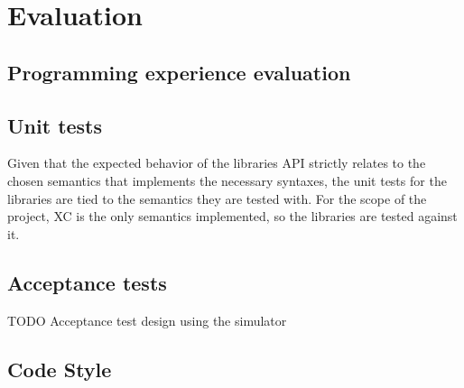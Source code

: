 \chapter{Evaluation}
\label{chap:evaluation}

\section{Programming experience evaluation}



\section{Unit tests}

Given that the expected behavior of the libraries \ac{API} strictly relates to the chosen semantics that implements the necessary syntaxes, the unit tests for the libraries are tied to the semantics they are tested with.
%
For the scope of the project, \ac{XC} is the only semantics implemented, so the libraries are tested against it.
%

\section{Acceptance tests}

TODO Acceptance test design using the simulator

\section{Code Style} \label{chap:evaluation->sec:code-style}
